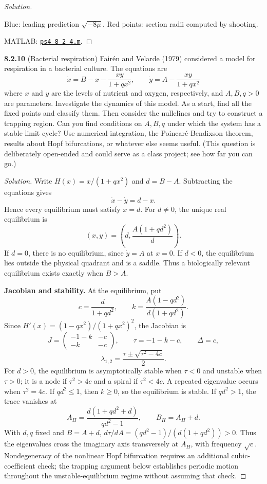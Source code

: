 \documentclass[10pt]{amsart}
\newenvironment{solution}
{\begin{proof}[Solution]}
{\end{proof}}
\begin{document}
\begin{onehalfspace}
\begin{solution}
\begin{center}
\par\medskip
\end{center}
Blue: leading prediction $\sqrt{-8\mu}$. Red points: section radii computed by shooting.

\medskip
\noindent MATLAB: \href{https://github.com/chtompki/MathFall2026/blob/main/DynamicalSystems/ProblemSet4/ps4_8_2_4.m}{\nolinkurl{ps4_8_2_4.m}}.

        \end{solution}

        \noindent\textbf{8.2.10}
        (Bacterial respiration) Fair\'en and Velarde (1979) considered a model for respiration in a bacterial culture. The equations are
        \[
            \dot{x}=B-x-\frac{xy}{1+qx^2},\qquad
            \dot{y}=A-\frac{xy}{1+qx^2}
        \]
        where $x$ and $y$ are the levels of nutrient and oxygen, respectively, and $A,B,q>0$ are parameters. Investigate the dynamics of this model. As a start, find all the fixed points and classify them. Then consider the nullclines and try to construct a trapping region. Can you find conditions on $A,B,q$ under which the system has a stable limit cycle? Use numerical integration, the Poincar\'e-Bendixson theorem, results about Hopf bifurcations, or whatever else seems useful. (This question is deliberately open-ended and could serve as a class project; see how far you can go.)

        \begin{solution}

Write $H(x)=x/(1+qx^2)$ and $d=B-A$. Subtracting the equations gives
\[
 \dot x-\dot y=d-x.
\]
Hence every equilibrium must satisfy $x=d$. For $d\ne0$, the unique real equilibrium is
\[
 (x,y)=\left(d,\frac{A(1+qd^2)}d\right).
\]
If $d=0$, there is no equilibrium, since $\dot y=A$ at $x=0$. If $d<0$, the equilibrium lies outside the physical quadrant and is a saddle. Thus a biologically relevant equilibrium exists exactly when $B>A$.

\textbf{Jacobian and stability.} At the equilibrium, put
\[
 c=\frac{d}{1+qd^2},\qquad
 k=\frac{A(1-qd^2)}{d(1+qd^2)}.
\]
Since $H'(x)=(1-qx^2)/(1+qx^2)^2$, the Jacobian is
\[
 J=\begin{pmatrix}-1-k&-c\\-k&-c\end{pmatrix},
 \qquad \tau=-1-k-c,\qquad \Delta=c,
\]
\[
 \lambda_{1,2}=\frac{\tau\pm\sqrt{\tau^2-4c}}2.
\]
For $d>0$, the equilibrium is asymptotically stable when $\tau<0$ and unstable when $\tau>0$; it is a node if $\tau^2>4c$ and a spiral if $\tau^2<4c$. A repeated eigenvalue occurs when $\tau^2=4c$. If $qd^2\leq1$, then $k\geq0$, so the equilibrium is stable. If $qd^2>1$, the trace vanishes at
\[
 A_H=\frac{d(1+qd^2+d)}{qd^2-1},\qquad B_H=A_H+d.
\]
With $d,q$ fixed and $B=A+d$, $d\tau/dA=(qd^2-1)/(d(1+qd^2))>0$. Thus the eigenvalues cross the imaginary axis transversely at $A_H$, with frequency $\sqrt c$. Nondegeneracy of the nonlinear Hopf bifurcation requires an additional cubic-coefficient check; the trapping argument below establishes periodic motion throughout the unstable-equilibrium regime without assuming that check.


\end{solution}
\end{onehalfspace}
\end{document}
